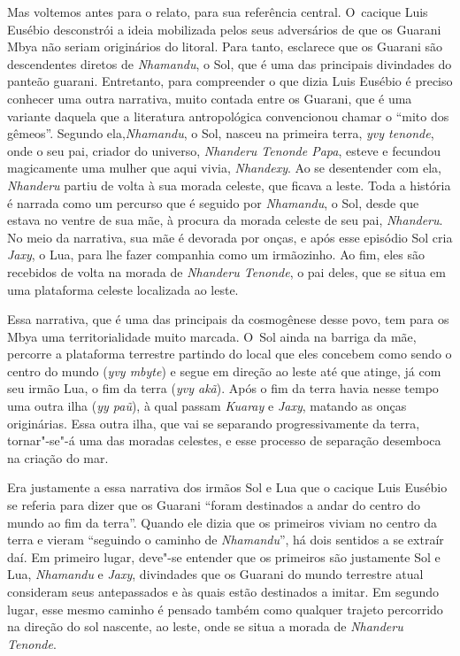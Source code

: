 Mas voltemos antes para o relato, para sua referência central. O~cacique
Luis Eusébio desconstrói a ideia mobilizada pelos seus adversários de
que os Guarani Mbya não seriam originários do litoral. Para tanto,
esclarece que os Guarani são descendentes diretos de \emph{Nhamandu}, o Sol,
que é uma das principais divindades do panteão guarani. Entretanto, para compreender o que dizia Luis Eusébio é preciso conhecer
uma outra narrativa, muito contada entre os Guarani, que é uma variante
daquela que a literatura antropológica convencionou chamar o ``mito dos
gêmeos''. Segundo ela,\emph{Nhamandu}, o Sol, nasceu na primeira terra, \emph{yvy
tenonde}, onde o seu pai, criador do universo, \emph{Nhanderu Tenonde Papa},
esteve e fecundou magicamente uma mulher que aqui vivia, \emph{Nhandexy}. Ao
se desentender com ela, \emph{Nhanderu} partiu de volta à sua morada celeste,
que ficava a leste. Toda a história é narrada como um percurso que é
seguido por \emph{Nhamandu}, o Sol, desde que estava no ventre de sua mãe, à
procura da morada celeste de seu pai, \emph{Nhanderu}. No meio da narrativa,
sua mãe é devorada por onças, e após esse episódio Sol cria \emph{Jaxy}, o
Lua, para lhe fazer companhia como um irmãozinho. Ao fim, eles são
recebidos de volta na morada de \emph{Nhanderu Tenonde}, o pai deles, que se
situa em uma plataforma celeste localizada ao leste.

Essa narrativa, que é uma das principais da cosmogênese desse povo, tem
para os Mbya uma territorialidade muito marcada. O~Sol ainda na barriga
da mãe, percorre a plataforma terrestre partindo do local que eles
concebem como sendo o centro do mundo (\emph{yvy mbyte}) e segue em direção ao
leste até que atinge, já com seu irmão Lua, o fim da terra (\emph{yvy akã}).
Após o fim da terra havia nesse tempo uma outra ilha (\emph{yy paũ}), à qual
passam \emph{Kuaray} e \emph{Jaxy}, matando as onças originárias. Essa outra ilha,
que vai se separando progressivamente da terra, tornar"-se"-á uma das
moradas celestes, e esse processo de separação desemboca na criação do
mar. 

Era justamente a essa narrativa dos irmãos Sol e Lua que o cacique Luis
Eusébio se referia para dizer que os Guarani ``foram destinados a andar
do centro do mundo ao fim da terra''. Quando ele dizia que os primeiros
viviam no centro da terra e vieram ``seguindo o caminho de \emph{Nhamandu}'', há
dois sentidos a se extraír daí. Em primeiro lugar, deve"-se entender que
os primeiros são justamente Sol e Lua, \emph{Nhamandu} e \emph{Jaxy}, divindades que
os Guarani do mundo terrestre atual consideram seus antepassados e às
quais estão destinados a imitar. Em segundo lugar, esse mesmo caminho é
pensado também como qualquer trajeto percorrido na direção do sol
nascente, ao leste, onde se situa a morada de \emph{Nhanderu Tenonde}.

